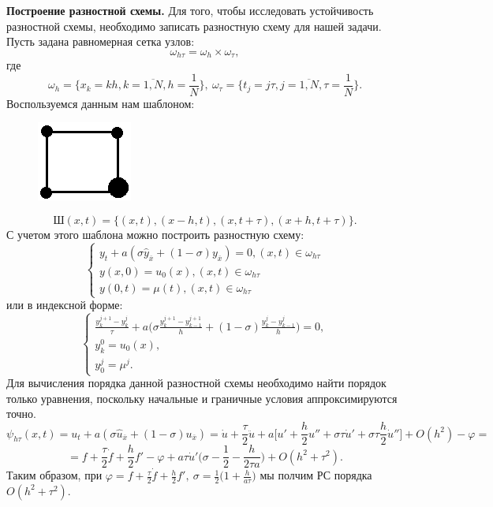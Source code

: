 \documentclass[11pt]{article}
\begin{document}
\textbf{Построение разностной схемы.} 
Для того, чтобы исследовать устойчивость разностной схемы, необходимо записать разностную схему для нашей задачи. Пусть задана равномерная сетка узлов:
$$\omega_{h\tau}=\omega_h \times \omega_{\tau},$$
где
$$\omega_h=\{x_k=kh, k=\overline{1,N}, h=\frac{1}{N} \},\ \omega_\tau=\{t_j=j\tau, j=\overline{1,N}, \tau=\frac{1}{N} \}.$$
Воспользуемся данным нам шаблоном:
\begin{figure}
    \centering
    \includegraphics[width=0.15\linewidth]{image1.png}
\end{figure}
$$\text{Ш}(x,t)=\{(x,t),(x-h,t),(x,t+\tau),(x+h, t+\tau) \}.$$
С учетом этого шаблона можно построить разностную схему:
$$\begin{cases}
    y_t+a(\sigma\hat{y}_{\overline{x}}+(1-\sigma)y_{\overline{x}})=0,(x,t)\in \omega_{h \tau}\\
    y(x,0)=u_0(x),(x,t)\in \omega_{h \tau}\\
    y(0,t)=\mu(t),(x,t)\in \omega_{h \tau}
\end{cases}$$
или в индексной форме:
$$\begin{cases}
    \frac{y_k^{j+1}-y_k^j}{\tau}+a\Big(\sigma\frac{y_k^{j+1}-y_{k-1}^{j+1}}{h}+(1-\sigma)\frac{y_k^{j}-y_{k-1}^{j}}{h}\Big)=0,\\
    y_k^0=u_0(x),\\
    y_0^j=\mu^j.
\end{cases}$$
Для вычисления порядка данной разностной схемы необходимо найти порядок только уравнения, поскольку начальные и граничные условия аппроксимируются точно.
$$\psi_{h\tau}(x,t)=u_t+a(\sigma\hat{u}_{\overline{x}}+(1-\sigma)u_{\overline{x}})=\dot{u}+\frac{\tau}{2}\ddot{u}+a\Big[u'+\frac{h}{2}u''+\sigma \tau \dot{u}'+\sigma \tau \frac{h}{2}\dot{u}''\Big]+O(h^2) - \varphi=$$$$ = f+\frac{\tau}{2}\dot{f}+\frac{h}{2}f'-\varphi+a\tau\dot{u}'\Big(\sigma-\frac{1}{2}-\frac{h}{2\tau a}\Big)+O(h^2+\tau^2).$$
Таким образом, при $\varphi = f+\frac{\tau}{2}\dot{f}+\frac{h}{2}f',\ \sigma=\frac{1}{2}\Big(1+\frac{h}{a\tau}\Big)$ мы полчим РС порядка $O(h^2+\tau^2).$
\end{document}

